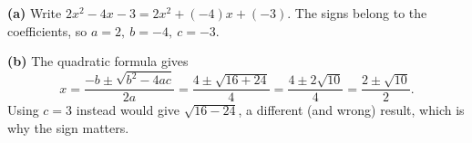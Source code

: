 \textbf{(a)} Write $2x^2-4x-3=2x^2+(-4)x+(-3)$. The signs belong to the coefficients, so $\boxed{a=2,\ b=-4,\ c=-3}$.

\textbf{(b)} The quadratic formula gives
\[
x=\dfrac{-b\pm\sqrt{b^2-4ac}}{2a}=\dfrac{4\pm\sqrt{16+24}}{4}=\dfrac{4\pm2\sqrt{10}}{4}=\boxed{\dfrac{2\pm\sqrt{10}}{2}} .
\]
Using $c=3$ instead would give $\sqrt{16-24}$, a different (and wrong) result, which is why the sign matters.
